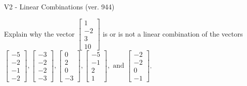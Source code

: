 \begin{exercise}
  \begin{exerciseTitle}V2 - Linear Combinations (ver. 944)\end{exerciseTitle}
  \begin{exerciseStatement}
    Explain why the vector \(\left[\begin{array}{c}
1 \\
-2 \\
3 \\
10
\end{array}\right]\)  is or is not a linear 
	combination of the vectors \(\left[\begin{array}{c}
-5 \\
-2 \\
-1 \\
-2
\end{array}\right] , \left[\begin{array}{c}
-3 \\
-2 \\
-2 \\
-3
\end{array}\right] , \left[\begin{array}{c}
0 \\
2 \\
0 \\
-3
\end{array}\right] , \left[\begin{array}{c}
-5 \\
-1 \\
2 \\
1
\end{array}\right] , \text{ and } \left[\begin{array}{c}
-2 \\
-2 \\
0 \\
-1
\end{array}\right]\).
	



\end{exerciseStatement}
\end{exercise}
